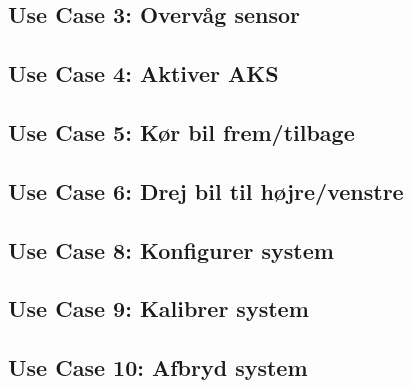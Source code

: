 \newpage
\subsection{Use Case 3: Overvåg sensor}


\newpage
\subsection{Use Case 4: Aktiver AKS}


\newpage
\subsection{Use Case 5: Kør bil frem/tilbage}


\newpage
\subsection{Use Case 6: Drej bil til højre/venstre}


\newpage
%

\newpage
\subsection{Use Case 8: Konfigurer system}




\newpage
\subsection{Use Case 9: Kalibrer system}


\newpage 
\subsection{Use Case 10: Afbryd system}
